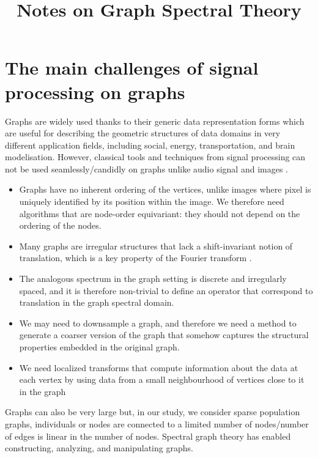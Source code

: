\documentclass[sigconf]{acmart}
\begin{document}
\title{Notes on Graph Spectral Theory}

\maketitle

\section{The main challenges of signal processing on graphs} 

Graphs are widely used thanks to their generic data representation forms which are useful for describing the geometric structures of data domains in very different application fields, including social, energy, transportation, and brain modelisation.
However, classical tools and techniques from signal processing can not be used seamlessly/candidly on graphs unlike audio signal and images \cite{shuman_emerging_2013}.

\begin{itemize}
    \item Graphs have no inherent ordering of the vertices, unlike images where pixel is uniquely identified by its position within the image. We therefore need algorithms that are node-order equivariant: they should not depend on the ordering of the nodes.
    \item Many graphs are irregular structures that lack a shift-invariant notion of translation, which is a key property of the Fourier transform \cite{daigavane_understanding_2021}.
    \item The analogous spectrum in the graph setting is discrete and irregularly spaced, and it is therefore non-trivial to define an operator that correspond to translation in the graph spectral domain.
    \item We may need to downsample a graph, and therefore we need a method to generate a coarser version of the graph that somehow captures the structural properties embedded in the original graph.
    \item We need localized transforms that compute information about the data at each vertex by using data from a small neighbourhood of vertices close to it in the graph
\end{itemize}
Graphs can also be very large but, in our study, we consider sparse population graphs, \ie individuals or nodes are connected to a limited number of nodes/number of edges is linear in the number of nodes.
Spectral graph theory has enabled constructing, analyzing, and manipulating graphs.
\end{document}
